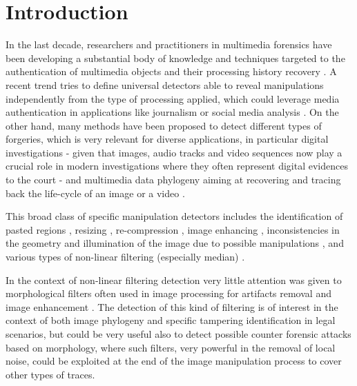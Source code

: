 \documentclass{ieeeaccess}
\begin{document}
\titlepgskip=-15pt

\maketitle

\section{Introduction}
\label{sec:intro}

In the last decade, researchers and practitioners in multimedia forensics have been developing a substantial body of knowledge and techniques targeted to the authentication of multimedia objects and their processing history recovery \cite{stamm_overview, farid_book, ho, piva_overview, sencar_book}. 
A recent trend tries to define universal detectors able to reveal manipulations independently from the type of processing applied, which could leverage media authentication in applications like journalism or social media analysis \cite{noiseprint}. 
On the other hand, many methods have been proposed to detect different types of forgeries, which is very relevant for diverse applications, in particular digital investigations - given that images, audio tracks and video sequences now play a crucial role in modern investigations where they often represent digital evidences to the court \cite{forlab} - and multimedia data phylogeny aiming at recovering and tracing back the life-cycle of an image or a video \cite{Bestagini2016, Dias2012, Oliveira2016, Costa2014}.

This broad class of specific manipulation detectors includes the identification of pasted regions \cite{cm2, cm3, cm4, spl2, spl3}, resizing \cite{fernando2017, PB-TIFS-2019}, re-compression \cite{PBPG2017-TIFS},  image enhancing \cite{shan2019robust}, inconsistencies in the geometry and illumination of the image due to possible manipulations \cite{geom1, geom2, phys1}, and various types of non-linear filtering (especially median) \cite{Bahrami2015, Cao2014, Cao2011, Fridrich2010, Tian2010, Yuan:2011, Liu2013, Huang2013, Shi2014, Wang2015, Pasquini2016-TIFS, gao2019robust}. 

In the context of non-linear filtering detection 
very little attention was given to morphological filters \cite{haas1967morphologie} often used in image processing for artifacts removal and image enhancement \cite{British2012} \cite{Maragos2004}. The detection of this kind of filtering is of interest in the context of both image phylogeny and specific tampering identification in legal scenarios, but could be very useful also to detect possible counter forensic attacks based on morphology, where such filters, very powerful in the removal of local noise, could be exploited at the end of the image manipulation process to cover other types of traces. 
\end{document}
